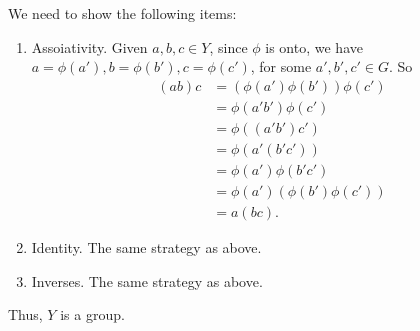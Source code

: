 \begin{dem}
	We need to show the following items:
	\begin{enumerate}
		\item Assoiativity. Given $a, b, c \in Y$, since $\phi$ is onto, we have $a = \phi(a'), b = \phi(b'), c = \phi(c')$, for some  $a', b', c' \in G$. So
			 \begin{align*}
				 (ab)c &= (\phi(a')\phi(b'))\phi(c')\\
					   &= \phi(a'b')\phi(c')\\
					   &= \phi((a'b')c')\\
					   &= \phi(a'(b'c'))\\
					   &= \phi(a')\phi(b'c')\\
					   &= \phi(a')(\phi(b')\phi(c'))\\
					   &= a(bc).
			 \end{align*}
		\item Identity. The same strategy as above.
		\item Inverses. The same strategy as above.
	\end{enumerate}

	Thus, $Y$ is a group.
\end{dem}
